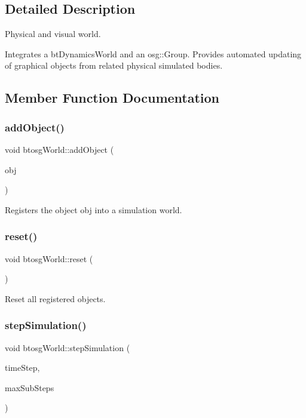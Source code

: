 \subsection{Detailed Description}
Physical and visual world. 

Integrates a bt\+Dynamics\+World and an osg\+::\+Group. Provides automated updating of graphical objects from related physical simulated bodies. 

\subsection{Member Function Documentation}
\mbox{\label{classbtosgWorld_ae5b71c6319dd420479096a265a1725b7}} 
\subsubsection{\texorpdfstring{add\+Object()}{addObject()}}
{\footnotesize\ttfamily void btosg\+World\+::add\+Object (\begin{DoxyParamCaption}\item[{class \hyperlink{classbtosgObject}{btosg\+Object} $\ast$}]{obj }\end{DoxyParamCaption})}

Registers the object obj into a simulation world. \mbox{\label{classbtosgWorld_a6af4d066410a86b44fff5563667ea9a9}} 
\subsubsection{\texorpdfstring{reset()}{reset()}}
{\footnotesize\ttfamily void btosg\+World\+::reset (\begin{DoxyParamCaption}{ }\end{DoxyParamCaption})}

Reset all registered objects. \mbox{\label{classbtosgWorld_afce096686d8f84afd8b8fa3f2dc161b8}} 
\subsubsection{\texorpdfstring{step\+Simulation()}{stepSimulation()}}
{\footnotesize\ttfamily void btosg\+World\+::step\+Simulation (\begin{DoxyParamCaption}\item[{bt\+Scalar}]{time\+Step,  }\item[{int}]{max\+Sub\+Steps }\end{DoxyParamCaption})}

